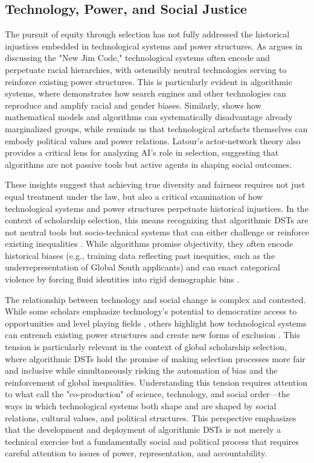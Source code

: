 \subsection{Technology, Power, and Social Justice}\label{ssec:context_tech_power_justice}
The pursuit of equity through selection has not fully addressed the historical injustices embedded in technological systems and power structures. As \textcite{benjamin2019race} argues in discussing the "New Jim Code," technological systems often encode and perpetuate racial hierarchies, with ostensibly neutral technologies serving to reinforce existing power structures. This is particularly evident in algorithmic systems, where \textcite{noble2018algorithms} demonstrates how search engines and other technologies can reproduce and amplify racial and gender biases. Similarly, \textcite{oneill2016weapons} shows how mathematical models and algorithms can systematically disadvantage already marginalized groups, while \textcite{winner1980artefacts} reminds us that technological artefacts themselves can embody political values and power relations. Latour's actor-network theory also provides a critical lens for analyzing AI's role in selection, suggesting that algorithms are not passive tools but active agents in shaping social outcomes.

These insights suggest that achieving true diversity and fairness requires not just equal treatment under the law, but also a critical examination of how technological systems and power structures perpetuate historical injustices. In the context of scholarship selection, this means recognizing that algorithmic DSTs are not neutral tools but socio-technical systems that can either challenge or reinforce existing inequalities \cite{barocas_fairness_2016}. While algorithms promise objectivity, they often encode historical biases (e.g., training data reflecting past inequities, such as the underrepresentation of Global South applicants) and can enact categorical violence by forcing fluid identities into rigid demographic bins \cite{scheuerman2019computers, bowker1999sorting}.

The relationship between technology and social change is complex and contested. While some scholars emphasize technology's potential to democratize access to opportunities and level playing fields \cite{rheingold2002smart}, others highlight how technological systems can entrench existing power structures and create new forms of exclusion \cite{eubanks2018automating}. This tension is particularly relevant in the context of global scholarship selection, where algorithmic DSTs hold the promise of making selection processes more fair and inclusive while simultaneously risking the automation of bias and the reinforcement of global inequalities. Understanding this tension requires attention to what \textcite{jasanoff2004states} call the "co-production" of science, technology, and social order—the ways in which technological systems both shape and are shaped by social relations, cultural values, and political structures. This perspective emphasizes that the development and deployment of algorithmic DSTs is not merely a technical exercise but a fundamentally social and political process that requires careful attention to issues of power, representation, and accountability.

